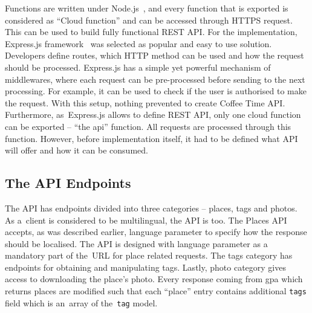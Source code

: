 Functions are written under Node.js~\cite{node-js}, and every function that is exported is considered as ``Cloud function'' and can be accessed through HTTPS request. This can be used to build fully functional REST API. For the implementation, Express.js framework~\cite{express-js} was selected as popular and easy to use solution. Developers define routes, which HTTP method can be used and how the request should be processed. 
Express.js has a simple yet powerful mechanism of middlewares, where each request can be pre-processed before sending to the next processing. For example, it can be used to check if the user is authorised to make the request. With this setup, nothing prevented to create Coffee Time API. Furthermore, as~Express.js allows to define REST API, only one cloud function can be exported -- ``the api'' function. All requests are processed through this function. However, before implementation itself, it had to be defined what API will offer and how it can be consumed. 
\subsection{The API Endpoints}
The API has endpoints divided into three categories -- places, tags and photos. As a~client is considered to be multilingual, the API is too. The Places API accepts, as was described earlier, language parameter to specify how the response should be localised. The API is designed with language parameter as a mandatory part of the~URL for place related requests. The tags category has endpoints for obtaining and manipulating tags. Lastly, photo category gives access to downloading the place's photo. Every response coming from \gls{gpa} which returns places are modified such that each ``place'' entry contains additional \verb|tags| field which is an~array of the~\verb|tag| model. 

